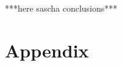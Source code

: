 \documentclass[UKenglish,texlive=2013]{\ATLASLATEXPATH atlasdoc}
\begin{document}
***here sascha conclusions***

\clearpage
\appendix
\part*{Appendix}




\end{document}
